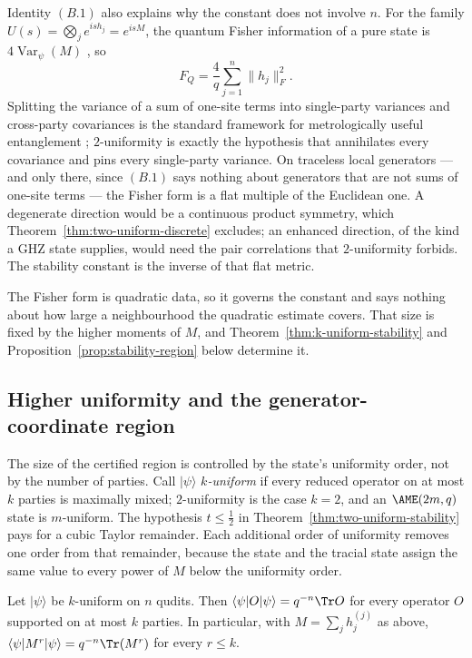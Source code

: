 \begin{remark}
\label{rem:fisher-isotropy}
Identity \((B.1)\) also explains why the constant does not involve \(n\).
For the family \(U(s)=\bigotimes_je^{ish_j}=e^{isM}\), the quantum Fisher
information of a pure state is \(4\operatorname{Var}_\psi(M)\)
\cite{BraunsteinCaves1994}, so
\[
 F_Q=\frac4q\sum_{j=1}^n\lVert h_j\rVert_F^2 .
\]
Splitting the variance of a sum of one-site terms into single-party
variances and cross-party covariances is the standard framework for
metrologically useful entanglement
\cite{HyllusEtAl2012,Toth2012}; \(2\)-uniformity is exactly the hypothesis
that annihilates every covariance and pins every single-party variance.  On
traceless local generators --- and only there, since \((B.1)\) says
nothing about generators that are not sums of one-site terms --- the Fisher
form is a flat multiple of the Euclidean one.  A degenerate direction would
be a continuous product symmetry, which
Theorem~\ref{thm:two-uniform-discrete} excludes; an enhanced direction, of
the kind a GHZ state supplies, would need the pair correlations that
\(2\)-uniformity forbids.  The stability constant is the inverse of that
flat metric.

The Fisher form is quadratic data, so it governs the constant and says
nothing about how large a neighbourhood the quadratic estimate covers.
That size is fixed by the higher moments of \(M\), and
Theorem~\ref{thm:k-uniform-stability} and
Proposition~\ref{prop:stability-region} below determine it.
\end{remark}

\subsection{Higher uniformity and the generator-coordinate region}

The size of the certified region is controlled by the state's uniformity
order, not by the number of parties.  Call
\(\lvert\psi\rangle\) \emph{\(k\)-uniform} if every reduced operator on at
most \(k\) parties is maximally mixed; \(2\)-uniformity is the case
\(k=2\), and an \(\AME(2m,q)\) state is \(m\)-uniform.  The hypothesis
\(t\leq\frac12\) in Theorem~\ref{thm:two-uniform-stability} pays for a
cubic Taylor remainder.  Each additional order of uniformity removes one
order from that remainder, because the state and the tracial state assign
the same value to every power of \(M\) below the uniformity order.

\begin{lemma}
\label{lem:tracial-agreement}
Let \(\lvert\psi\rangle\) be \(k\)-uniform on \(n\) qudits.  Then
\(\langle\psi\rvert O\lvert\psi\rangle=q^{-n}\Tr O\) for every operator
\(O\) supported on at most \(k\) parties.  In particular, with
\(M=\sum_jh_j^{(j)}\) as above,
\(\langle\psi\rvert M^r\lvert\psi\rangle=q^{-n}\Tr(M^r)\) for every
\(r\leq k\).
\end{lemma}

